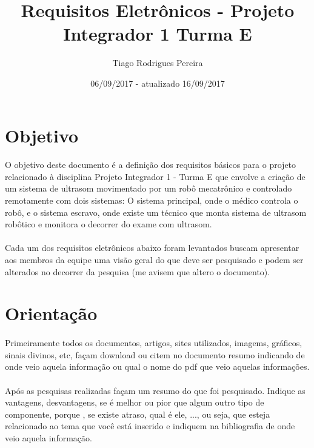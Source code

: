 \documentclass[a4paper]{article}
\title{Requisitos Eletrônicos - Projeto Integrador 1 Turma E}
\author{Tiago Rodrigues Pereira}
\date{06/09/2017 - atualizado 16/09/2017}
\begin{document}
\maketitle

\section{Objetivo}

\paragraph{} O objetivo deste documento é a definição dos requisitos básicos para o projeto relacionado à disciplina Projeto Integrador 1 - Turma E que envolve a criação de um sistema de ultrasom movimentado por um robô mecatrônico e controlado remotamente com dois sistemas: O sistema principal, onde o médico controla o robô, e o sistema escravo, onde existe um técnico que monta sistema de ultrasom robôtico e monitora o  decorrer do exame com ultrasom.

\paragraph{} Cada um dos requisitos eletrônicos abaixo foram levantados buscam apresentar aos membros da equipe uma visão geral do que deve ser pesquisado e podem ser alterados no decorrer da pesquisa (me avisem que altero o documento).

\section{Orientação}
\paragraph{} Primeiramente todos os documentos, artigos, sites utilizados, imagems, gráficos, sinais divinos, etc, façam download ou citem no documento resumo indicando de onde veio aquela informação ou qual o nome do pdf que veio aquelas informações. 

\paragraph{} Após as pesquisas realizadas façam um resumo do que foi pesquisado. Indique as vantagens, desvantagens, se é melhor ou pior que algum outro tipo de componente, porque , se existe atraso, qual é ele, ..., ou seja, que esteja relacionado ao tema que você está inserido e indiquem na bibliografia de onde veio aquela informação. 
\end{document}
